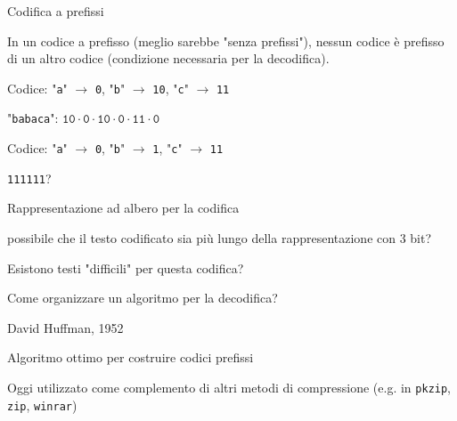 \begin{frame}{Codifica a prefissi}

\vspace{-9pt}
\begin{myboxtitle}
In un codice a prefisso (meglio sarebbe "senza prefissi"), \alert{nessun codice è
prefisso di un altro codice} (condizione necessaria per la decodifica).
\end{myboxtitle}

\begin{myboxtitle}[Esempio 1]
\BI
\item Codice: "\texttt{a}" $\rightarrow$ \texttt{0}, "\texttt{b}" $\rightarrow$ \texttt{10}, "\texttt{c}" $\rightarrow$ \texttt{11}
\item "\texttt{babaca}": $\texttt{10} \cdot \texttt{0} \cdot \texttt{10} \cdot \texttt{0} \cdot \texttt{11} \cdot \texttt{0}$
\EI
\end{myboxtitle}

\begin{myboxtitle}[Esempio 2]
\BI
\item Codice: "\texttt{a}" $\rightarrow$ \texttt{0}, "\texttt{b}" $\rightarrow$ \texttt{1}, "\texttt{c}" $\rightarrow$ \texttt{11}
\item \texttt{111111}?
\EI
\end{myboxtitle}

\end{frame}


\begin{frame}{Rappresentazione ad albero per la codifica}

\vspace{-9pt}
\begin{myboxtitle}
\BIL
\item \EE possibile che il testo codificato sia più lungo della rappresentazione con 3 bit?
\item Esistono testi "difficili" per questa codifica?
\item Come organizzare un algoritmo per la decodifica?
\EIL
\end{myboxtitle}

\begin{myboxtitle}
\BIL
\item David Huffman, 1952
\item Algoritmo ottimo per costruire codici prefissi
\item Oggi utilizzato come complemento di altri metodi di compressione
(e.g. in \texttt{pkzip}, \texttt{zip}, \texttt{winrar})
\EIL
\end{myboxtitle}

\end{frame}

